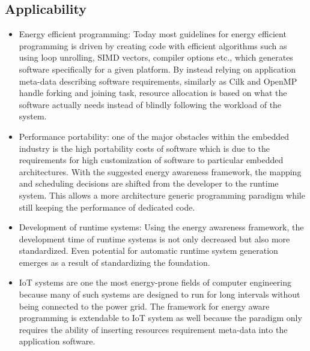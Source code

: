 \documentclass{article}
\begin{document}
\subsection{Applicability}
\begin{itemize}
 \item Energy efficient programming: Today most guidelines for energy efficient programming is driven by creating code with efficient algorithms such as using loop unrolling, SIMD vectors, compiler options etc., which generates software specifically for a given platform. 
 By instead relying on application meta-data describing software requirements, similarly as Cilk and OpenMP handle forking and joining task, resource allocation is based on what the software actually needs instead of blindly following the workload of the system.
 \item Performance portability: one of the major obstacles within the embedded industry is the high portability costs of software which is due to the requirements for high customization of software to particular embedded architectures. 
 With the suggested energy awareness framework, the mapping and scheduling decisions are shifted from the developer to the runtime system. 
 This allows a more architecture generic programming paradigm while still keeping the performance of dedicated code.
 \item Development of runtime systems: Using the energy awareness framework, the development time of runtime systems is not only decreased but also more standardized. 
 Even potential for automatic runtime system generation emerges as a result of standardizing the foundation.
 \item 
 IoT systems are one the most energy-prone fields of computer engineering because many of such systems are designed to run for long intervals without being connected to the power grid. 
 The framework for energy aware programming is extendable to IoT system as well because the paradigm only requires the ability of inserting resources requirement meta-data into the application software. 
\end{itemize}
\end{document}
